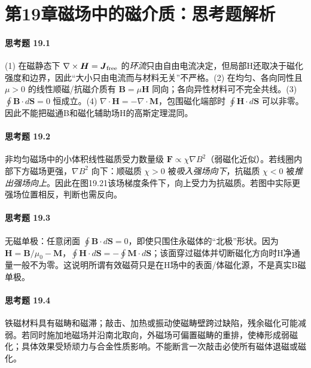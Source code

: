 \section*{第19章\quad 磁场中的磁介质：思考题解析}
\paragraph{思考题 19.1}
(1) 在磁静态下 \(\nabla\times\boldsymbol H=\boldsymbol J_{\rm free}\) 的\emph{环流}只由自由电流决定，但局部H还取决于磁化强度和边界，因此“大小只由电流而与材料无关”不严格。(2) 在均匀、各向同性且 \(\mu>0\) 的线性顺磁/抗磁介质有 \(\boldsymbol B=\mu\boldsymbol H\) 同向；各向异性材料可不完全共线。(3) \(\oint\boldsymbol B\cdot d\boldsymbol S=0\) 恒成立。(4) \(\nabla\cdot\boldsymbol H=-\nabla\cdot\boldsymbol M\)，包围磁化端部时 \(\oint\boldsymbol H\cdot d\boldsymbol S\) 可以非零。因此不能把磁通B和磁化辅助场H的高斯定理混同。

\paragraph{思考题 19.2}
非均匀磁场中的小体积线性磁质受力数量级 \(\boldsymbol F\propto \chi\nabla B^2\)（弱磁化近似）。若线圈内部下方磁场更强，\(\nabla B^2\) 向下：顺磁质 \(\chi>0\) 被\emph{吸入强场向下}，抗磁质 \(\chi<0\) 被\emph{推出强场向上}。因此在图19.21该场梯度条件下，\(\boxed{\text{向上受力为抗磁质}}\)。若图中实际更强场位置相反，判断也需反向。

\paragraph{思考题 19.3}
无磁单极：任意闭面 \(\boxed{\oint\boldsymbol B\cdot d\boldsymbol S=0}\)，即使只围住永磁体的“北极”形状。因为 \(\boldsymbol H=\boldsymbol B/\mu_0-\boldsymbol M\)，\(\boxed{\oint\boldsymbol H\cdot d\boldsymbol S=-\oint\boldsymbol M\cdot d\boldsymbol S}\)；该面穿过磁体并切断磁化方向时H净通量一般不为零。这说明所谓有效磁荷只是在H场中的表面/体磁化源，不是真实B磁单极。

\paragraph{思考题 19.4}
铁磁材料具有磁畴和磁滞；敲击、加热或振动使磁畴壁跨过缺陷，残余磁化可能减弱。若同时施加地磁场并沿南北取向，外磁场可偏置磁畴的重排，使棒形成弱磁化；具体效果受矫顽力与合金性质影响。不能断言一次敲击必使所有磁体退磁或磁化。

